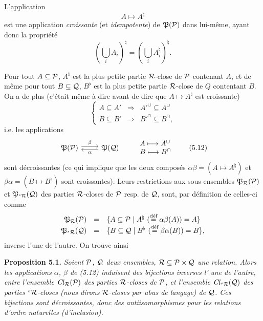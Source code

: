 L'application
\[
A \longmapsto A^{\natural}
\tag*{(5.10)}
\]
est une application \textit{croissante} (et \textit{idempotente}) de $\mathfrak{P}(\mathcal{P})$ dans lui-même, ayant donc la propriété
\[
(\bigcup_i A_i)^{\natural} = (\bigcup_i A_i^{\natural})^{\natural}.
\]


Pour tout $A \subseteq \mathcal{P}$, $A^{\natural}$ est la plus petite partie $\mathcal{R}$-close de $\mathcal{P}$ contenant $A$, et de même pour tout $B \subseteq \mathcal{Q}$, $B^{\flat}$ est la plus petite partie $\mathcal{R}$-close de $Q$ contentant $B$. On a de plus (c'était même à dire avant de dire que $A \longmapsto A^{\natural}$ est croissante) %
\[
\left\{
\begin{array}{rcl}
A \subseteq A' & \Longrightarrow & A'^{\cup} \subseteq A^{\cup}\\[1ex]
B \subseteq B' & \Longrightarrow & B'^{\cap} \subseteq B^{\cap},
\end{array}
\right.
\tag*{(5.11)}
\]
i.e. les applications
\[
\begin{tikzcd}
\fP(\cP) \arrow[r, shift left, "\beta"] & \fP(\cQ) \arrow[l, shift left, "\alpha"]
\end{tikzcd}
\qquad
\begin{array}{l}
A \longmapsto A^{\cup}\\
B \longmapsto B^{\cap}
\end{array}
\tag*{(5.12)}
\]
sont décroissantes (ce qui implique que les deux composés $\alpha\beta = (A \longmapsto A^{\natural})$ et $\beta\alpha = (B \longmapsto B^{\flat})$ sont croissantes). Leurs restrictions aux sous-ensembles $\mathfrak{P}_{\mathcal{R}}(\mathcal{P})$ et $\mathfrak{P}_{{}^{s}\mathcal{R}}(\mathcal{Q})$ des parties $\mathcal{R}$-closes de $\mathcal{P}$ resp. de $\mathcal{Q}$, sont, par définition de celles-ci comme
\[
\begin{array}{rcl}
\fP_{\cR}(\cP) & = & \{A \subseteq \cP \mid A^{\natural} \ (\overset{\text{déf}}{=} \alpha\beta(A)) = A\}\\
\fP_{\sR}(\cQ) & = & \{B \subseteq \cQ \mid B^{\flat} \ (\overset{\text{déf}}{=} \beta\alpha(B)) = B\},
\end{array}
\]
inverse l'une de l'autre. On trouve ainsi

\textbf{Proposition 5.1.} \textit{Soient $\mathcal{P}$, $\mathcal{Q}$ deux ensembles, $\mathcal{R} \subseteq \mathcal{P} \times \mathcal{Q}$ une relation. Alors les applications $\alpha$, $\beta$ de (5.12) induisent des bijections inverses l'}
\textit{une de l'autre, entre l'ensemble $\mathit{Cl}_{\mathcal{R}}(\mathcal{P})$ des parties $\mathcal{R}$-closes de $\mathcal{P}$, et l'ensemble $\mathit{Cl}_{{}^{s}\mathcal{R}}(\mathcal{Q})$ des parties ${}^{s}\mathcal{R}$-closes (nous dirons $\mathcal{R}$-closes par abus de langage) de $\mathcal{Q}$. Ces bijections sont décroissantes, donc des antiisomorphismes pour les relations d'ordre naturelles (d'inclusion).}

